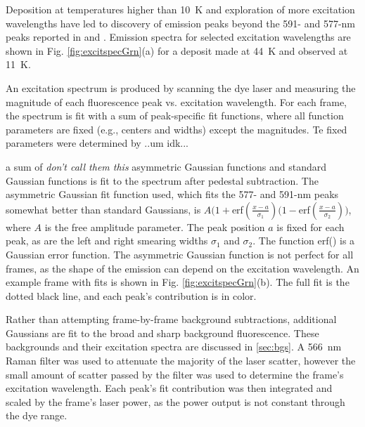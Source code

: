 

Deposition at temperatures higher than 10~K and exploration of more excitation wavelengths have led to discovery of emission peaks beyond the 591- and 577-nm peaks reported in \cite{Shon} and \cite{Brian}.  Emission spectra for selected excitation wavelengths are shown in Fig. \ref{fig:excitspecGrn}(a) for a deposit made at 44~K and observed at 11~K.  


An excitation spectrum is produced by scanning the dye laser and measuring the magnitude of each fluorescence peak vs. excitation wavelength.  For each frame, the spectrum is fit with a sum of peak-specific fit functions, where all function parameters are fixed (e.g., centers and widths) except the magnitudes.  Te fixed parameters were determined by ..um idk... 

a sum of \emph{\color{gray}don't call them this} asymmetric Gaussian functions and standard Gaussian functions is fit to the spectrum after pedestal subtraction.  The asymmetric Gaussian fit function used, which fits the 577- and 591-nm peaks somewhat better than standard Gaussians, is $A(1+$erf$(\frac{x-a}{\sigma_{1}})(1-$erf$(\frac{x-a}{\sigma_{2}}))$, where $A$ is the free amplitude parameter.  The peak position $a$ is fixed for each peak, as are the left and right smearing widths $\sigma_{1}$ and $\sigma_{2}$.  The function erf() is a Gaussian error function.  The asymmetric Gaussian function is not perfect for all frames, as the shape of the emission can depend on the excitation wavelength.  An example frame with fits is shown in Fig. \ref{fig:excitspecGrn}(b).  The full fit is the dotted black line, and each peak's contribution is in color.  


Rather than attempting frame-by-frame background subtractions, additional Gaussians are fit to the broad and sharp background fluorescence.  These backgrounds and their excitation spectra are discussed in \ref{sec:bgs}.  A 566~nm Raman filter was used to attenuate the majority of the laser scatter, however the small amount of scatter passed by the filter was used to determine the frame's excitation wavelength.  Each peak's fit contribution was then integrated and scaled by the frame's laser power, as the power output is not constant through the dye range.

